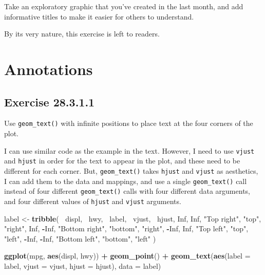 \documentclass[]{book}
\newenvironment{Shaded}{\begin{snugshade}}{\end{snugshade}}
\newcommand{\DataTypeTok}[1]{\textcolor[rgb]{0.13,0.29,0.53}{#1}}
\newcommand{\KeywordTok}[1]{\textcolor[rgb]{0.13,0.29,0.53}{\textbf{#1}}}
\newcommand{\NormalTok}[1]{#1}
\newcommand{\OperatorTok}[1]{\textcolor[rgb]{0.81,0.36,0.00}{\textbf{#1}}}
\newcommand{\OtherTok}[1]{\textcolor[rgb]{0.56,0.35,0.01}{#1}}
\newcommand{\StringTok}[1]{\textcolor[rgb]{0.31,0.60,0.02}{#1}}
\theoremstyle{plain}
\theoremstyle{remark}
\begin{document}
Take an exploratory graphic that you've created in the last month, and add informative titles to make it easier for others to understand.

By its very nature, this exercise is left to readers.

\hypertarget{annotations}{%
\section{Annotations}\label{annotations}}

\hypertarget{exercise-28.3.1.1}{%
\subsection*{\texorpdfstring{Exercise {28.3.1.1}}{Exercise 28.3.1.1}}\label{exercise-28.3.1.1}}

Use \texttt{geom\_text()} with infinite positions to place text at the four corners of the plot.

I can use similar code as the example in the text.
However, I need to use \texttt{vjust} and \texttt{hjust} in order for the text to appear in the plot, and these need to be different for each corner.
But, \texttt{geom\_text()} takes \texttt{hjust} and \texttt{vjust} as aesthetics, I can add them to the data and mappings, and use a single \texttt{geom\_text()} call instead of four different \texttt{geom\_text()} calls with four different data arguments, and four different values of \texttt{hjust} and \texttt{vjust} arguments.

\begin{Shaded}
\begin{Highlighting}[]
\NormalTok{label <-}\StringTok{ }\KeywordTok{tribble}\NormalTok{(}
  \OperatorTok{~}\NormalTok{displ, }\OperatorTok{~}\NormalTok{hwy, }\OperatorTok{~}\NormalTok{label, }\OperatorTok{~}\NormalTok{vjust, }\OperatorTok{~}\NormalTok{hjust,}
     \OtherTok{Inf}\NormalTok{,  }\OtherTok{Inf}\NormalTok{,    }\StringTok{"Top right"}\NormalTok{, }\StringTok{"top"}\NormalTok{, }\StringTok{"right"}\NormalTok{,}
     \OtherTok{Inf}\NormalTok{, }\OperatorTok{-}\OtherTok{Inf}\NormalTok{,    }\StringTok{"Bottom right"}\NormalTok{, }\StringTok{"bottom"}\NormalTok{, }\StringTok{"right"}\NormalTok{,}
    \OperatorTok{-}\OtherTok{Inf}\NormalTok{,  }\OtherTok{Inf}\NormalTok{,    }\StringTok{"Top left"}\NormalTok{, }\StringTok{"top"}\NormalTok{, }\StringTok{"left"}\NormalTok{,}
    \OperatorTok{-}\OtherTok{Inf}\NormalTok{, }\OperatorTok{-}\OtherTok{Inf}\NormalTok{,    }\StringTok{"Bottom left"}\NormalTok{, }\StringTok{"bottom"}\NormalTok{, }\StringTok{"left"}
\NormalTok{)}

\KeywordTok{ggplot}\NormalTok{(mpg, }\KeywordTok{aes}\NormalTok{(displ, hwy)) }\OperatorTok{+}
\StringTok{  }\KeywordTok{geom_point}\NormalTok{() }\OperatorTok{+}
\StringTok{  }\KeywordTok{geom_text}\NormalTok{(}\KeywordTok{aes}\NormalTok{(}\DataTypeTok{label =}\NormalTok{ label, }\DataTypeTok{vjust =}\NormalTok{ vjust, }\DataTypeTok{hjust =}\NormalTok{ hjust), }\DataTypeTok{data =}\NormalTok{ label)}
\end{Highlighting}
\end{Shaded}
\end{document}
